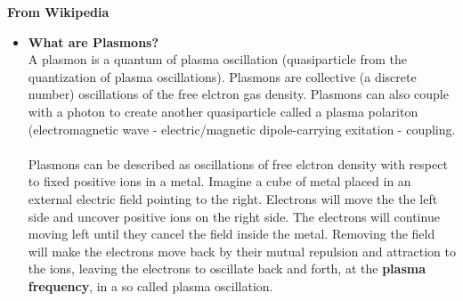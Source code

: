 \newpage
\textbf{From Wikipedia}
\begin{itemize}
   \item \textbf{What are Plasmons?} \\
A plasmon is a quantum of plasma oscillation (quasiparticle from the quantization of plasma oscillations).
Plasmons are collective (a discrete number) oscillations of the free elctron gas density.
Plasmons can also couple with a photon to create another quasiparticle called a plasma polariton
(electromagnetic wave - electric/magnetic dipole-carrying exitation - coupling.
\\
\\
Plasmons can be described as oscillations of free elctron density with respect to
fixed positive ions in a metal. Imagine a cube of metal placed in an external 
electric field pointing to the right. Electrons will move the the left side and uncover
positive ions on the right side. The electrons will continue moving left until they
cancel the field inside the metal. Removing the field will make the electrons move back by their
mutual repulsion and attraction to the ions, leaving the electrons to oscillate back and forth,
at the \textbf{plasma frequency}, in a so called plasma oscillation.


\end{itemize}
